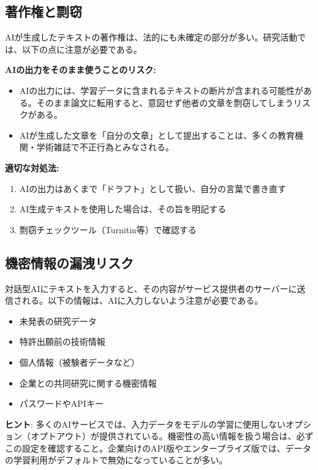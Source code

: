 \subsection{著作権と剽窃}

AIが生成したテキストの著作権は、法的にも未確定の部分が多い。研究活動では、以下の点に注意が必要である。

\textbf{AIの出力をそのまま使うことのリスク:}
\begin{itemize}
\item AIの出力には、学習データに含まれるテキストの断片が含まれる可能性がある。そのまま論文に転用すると、意図せず他者の文章を剽窃してしまうリスクがある。
\item AIが生成した文章を「自分の文章」として提出することは、多くの教育機関・学術雑誌で不正行為とみなされる。
\end{itemize}

\textbf{適切な対処法:}
\begin{enumerate}
\item AIの出力はあくまで「ドラフト」として扱い、自分の言葉で書き直す
\item AI生成テキストを使用した場合は、その旨を明記する
\item 剽窃チェックツール（Turnitin等）で確認する
\end{enumerate}

\subsection{機密情報の漏洩リスク}

対話型AIにテキストを入力すると、その内容がサービス提供者のサーバーに送信される。以下の情報は、AIに入力しないよう注意が必要である。

\begin{itemize}
\item 未発表の研究データ
\item 特許出願前の技術情報
\item 個人情報（被験者データなど）
\item 企業との共同研究に関する機密情報
\item パスワードやAPIキー
\end{itemize}

\begin{screen}
\textbf{ヒント}: 多くのAIサービスでは、入力データをモデルの学習に使用しないオプション（オプトアウト）が提供されている。機密性の高い情報を扱う場合は、必ずこの設定を確認すること。企業向けのAPI版やエンタープライズ版では、データの学習利用がデフォルトで無効になっていることが多い。
\end{screen}

